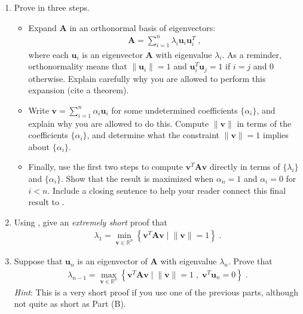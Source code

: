 \documentclass[11pt]{article}
\begin{document}
\begin{tcolorbox}[title = 4. Eigenpairs of symmetric matrices and optimization]
\begin{enumerate}
    \item 
    Prove  in three steps. 
    \begin{itemize}
        \item Expand $\mathbf{A}$ in an orthonormal basis of eigenvectors: 
        \begin{align*}
            \mathbf{A} = \sum_{i = 1}^n \lambda_i\mathbf{u}_i\mathbf{u}_i^T\;,
        \end{align*}
        where each $\mathbf{u}_i$ is an eigenvector $\mathbf{A}$ with eigenvalue $\lambda_i$. 
        As a reminder, orthonormality means that $\lVert \mathbf{u}_i \rVert = 1$ and $\mathbf{u}_i^T \mathbf{u}_j = 1$ if $i = j$ and $0$ otherwise.   
        Explain carefully why you are allowed to perform this expansion (cite a theorem). 
        \item Write $\mathbf{v} = \sum_{i = 1}^n \alpha_i \mathbf{u}_i$ for some undetermined coefficients $\{\alpha_i\}$, and explain why you are allowed to do this. 
        Compute $\lVert \mathbf{v}\rVert$ in terms of the coefficients $\{\alpha_i\}$, and determine what the constraint $\lVert \mathbf{v} \rVert = 1$ implies about $\{\alpha_i\}$. 
        \item Finally, use the first two steps to compute $\mathbf{v}^T\mathbf{A}\mathbf{v}$ directly in terms of $\{\lambda_i\}$ and $\{\alpha_i\}$. 
        Show that the result is maximized when $\alpha_n = 1$ and $\alpha_i = 0$ for $i < n$. 
        Include a closing sentence to help your reader connect this final result to . 
    \end{itemize}
    
    \item 
    Using , give an \emph{extremely short} proof that
    \begin{align*}
        \lambda_1 = \min_{\mathbf{v} \in \mathbb{R}^n} \left\{\mathbf{v}^T\mathbf{A}\mathbf{v} \;\big|\; \lVert{\mathbf{v}}\rVert = 1\right\} \;.
    \end{align*} 

    \item 
    Suppose that $\mathbf{u}_n$ is an eigenvector of $\mathbf{A}$ with eigenvalue $\lambda_n$. 
    Prove that 
    \begin{align*}
        \lambda_{n-1} = \max_{\mathbf{v} \in \mathbb{R}^n} \left\{\mathbf{v}^T\mathbf{A}\mathbf{v} \;\big|\; \lVert{\mathbf{v}}\rVert = 1\;, \; \mathbf{v}^T\mathbf{u}_n = 0\right\}\;. 
    \end{align*}
    \emph{Hint}: This is a very short proof if you use one of the previous parts, although not quite as short as Part (B). 
\end{enumerate}
\end{tcolorbox}
\end{document}
